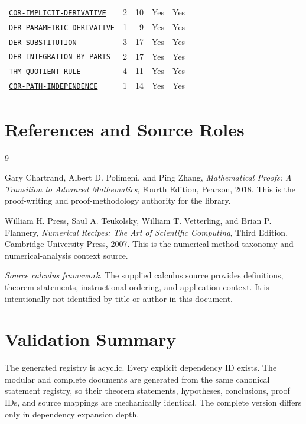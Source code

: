 \documentclass[10pt]{article}
\newcommand{\pidraw}[1]{\begingroup\urlstyle{tt}\nolinkurl{#1}\endgroup}
\newcommand{\pidref}[1]{\hyperref[prf:#1]{\pidraw{#1}}}
\theoremstyle{definition}
\theoremstyle{remark}
\begin{document}
\begin{landscape}
\begin{longtable}{@{}lrrrr@{}}
\pidref{COR-IMPLICIT-DERIVATIVE} & 2 & 10 & Yes & Yes \\
\pidref{DER-PARAMETRIC-DERIVATIVE} & 1 & 9 & Yes & Yes \\
\pidref{DER-SUBSTITUTION} & 3 & 17 & Yes & Yes \\
\pidref{DER-INTEGRATION-BY-PARTS} & 2 & 17 & Yes & Yes \\
\pidref{THM-QUOTIENT-RULE} & 4 & 11 & Yes & Yes \\
\pidref{COR-PATH-INDEPENDENCE} & 1 & 14 & Yes & Yes \\
\bottomrule
\end{longtable}
\end{landscape}

\section{References and Source Roles}

\begin{thebibliography}{9}

Gary Chartrand, Albert D. Polimeni, and Ping Zhang,
\emph{Mathematical Proofs: A Transition to Advanced Mathematics},
Fourth Edition, Pearson, 2018.
This is the proof-writing and proof-methodology authority for the library.

William H. Press, Saul A. Teukolsky, William T. Vetterling, and Brian P. Flannery,
\emph{Numerical Recipes: The Art of Scientific Computing},
Third Edition, Cambridge University Press, 2007.
This is the numerical-method taxonomy and numerical-analysis context source.

\emph{Source calculus framework}.
The supplied calculus source provides definitions, theorem statements, instructional ordering,
and application context. It is intentionally not identified by title or author in this document.

\end{thebibliography}

\section*{Validation Summary}
The generated registry is acyclic. Every explicit dependency ID exists. The modular and complete
documents are generated from the same canonical statement registry, so their theorem statements,
hypotheses, conclusions, proof IDs, and source mappings are mechanically identical. The complete
version differs only in dependency expansion depth.
\end{document}
